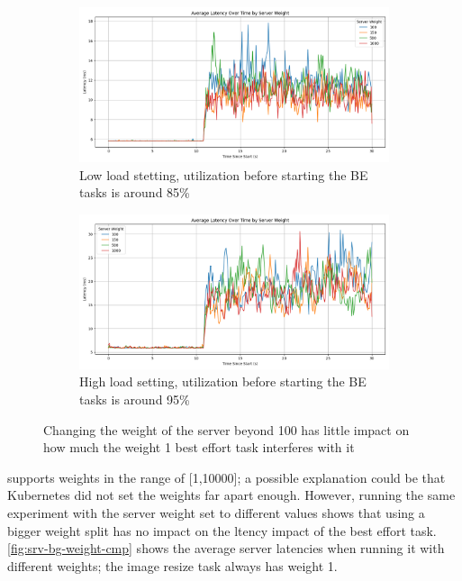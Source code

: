 \begin{figure}[t]
    \centering
    \begin{subfigure}{\columnwidth}
        \includegraphics[width=\columnwidth]{graphs/srv-bg-weight-cmp-low.png}
        \caption{Low load stetting, utilization before starting the BE tasks is
        around 85\%}\label{fig:srv-bg-weight-cmp-low}
        \vspace{12pt}
    \end{subfigure}
    \hspace{\fill}
    \begin{subfigure}{\columnwidth}
        \includegraphics[width=\columnwidth]{graphs/srv-bg-weight-cmp-high.png}
        \caption{High load setting, utilization before starting the BE tasks is
        around 95\%}\label{fig:srv-bg-weight-cmp-high}
    \end{subfigure}
    \vspace{4pt}
    \caption{Changing the weight of the server beyond 100 has little impact on
    how much the weight 1 best effort task interferes with it}\label{fig:srv-bg-weight-cmp}
\end{figure}

\cgroups{} supports weights in the range of [1,10000]; a possible explanation
could be that Kubernetes did not set the weights far apart enough. However,
running the same experiment with the server weight set to different values shows
that using a bigger weight split has no impact on the ltency impact of the best
effort task. \autoref{fig:srv-bg-weight-cmp} shows the average server latencies
when running it with different weights; the image resize task always has weight 1.

